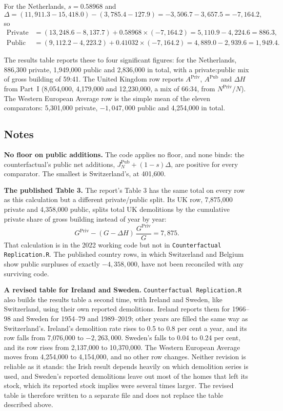 \documentclass[11pt,a4paper]{article}
\newcommand{\priv}{\mathrm{Priv}}
\newcommand{\pub}{\mathrm{Pub}}
\newcommand{\code}[1]{\texttt{#1}}
\begin{document}
For the Netherlands, $s = 0.58968$ and
\[
  \Delta = (11{,}911.3 - 15{,}418.0) - (3{,}785.4 - 127.9) = -3{,}506.7 - 3{,}657.5 = -7{,}164.2,
\]
so
\begin{align*}
  \text{Private surplus} &= (13{,}248.6 - 8{,}137.7) + 0.58968 \times (-7{,}164.2)
                          = 5{,}110.9 - 4{,}224.6 = 886.3,\\
  \text{Public surplus}  &= (9{,}112.2 - 4{,}223.2) + 0.41032 \times (-7{,}164.2)
                          = 4{,}889.0 - 2{,}939.6 = 1{,}949.4.
\end{align*}

The results table reports these to four significant figures: for the Netherlands, 886,300
private, 1,949,000 public and 2,836,000 in total, with a private:public mix of gross
building of 59:41. The United Kingdom row reports $A^{\priv}$, $A^{\pub}$ and $\Delta H$
from Part~I (8,054,000, 4,179,000 and 12,230,000, a mix of 66:34, from
$N^{\priv}/N$). The Western European Average row is the simple mean of the eleven
comparators: 5,301,000 private, $-1{,}047{,}000$ public and 4,254,000 in total.

\subsection*{Notes}

\textbf{No floor on public additions.} The code applies no floor, and none binds: the
counterfactual's public net additions, $J_N^{\pub} + (1 - s)\Delta$, are positive for
every comparator. The smallest is Switzerland's, at 401,600.

\textbf{The published Table 3.} The report's Table 3 has the same total on every row as
this calculation but a different private/public split. Its UK row, 7,875,000 private and
4,358,000 public, splits total UK demolitions by the cumulative private share of gross
building instead of year by year:
\[
  G^{\priv} - (G - \Delta H)\,\frac{G^{\priv}}{G} = 7{,}875.
\]
That calculation is in the 2022 working code but not in
\code{Counterfactual Replication.R}. The published country rows, in which Switzerland and
Belgium show public surpluses of exactly $-4{,}358{,}000$, have not been reconciled with
any surviving code.

\textbf{A revised table for Ireland and Sweden.} \code{Counterfactual Replication.R} also builds
the results table a second time, with Ireland and Sweden, like Switzerland, using their own
reported demolitions. Ireland reports them for 1966--98 and Sweden for 1954--79 and 1989--2019;
other years are filled the same way as Switzerland's. Ireland's demolition rate rises to 0.5 to
0.8 per cent a year, and its row falls from 7,076,000 to $-2{,}263{,}000$. Sweden's falls to 0.04
to 0.24 per cent, and its row rises from 2,137,000 to 10,370,000. The Western European Average
moves from 4,254,000 to 4,154,000, and no other row changes. Neither revision is reliable as it
stands: the Irish result depends heavily on which demolition series is used, and Sweden's reported
demolitions leave out most of the homes that left its stock, which its reported stock implies were
several times larger. The revised table is therefore written to a separate file and does not
replace the table described above.
\end{document}
